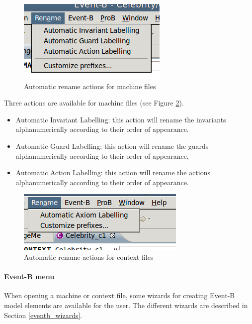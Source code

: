 \begin{figure}[!ht]
\begin{center}
	\includegraphics{img/reference/ref_01_menubar1.png}
	\caption{Automatic rename actions for machine files}
	\label{fig_ref_01_menubar1}
\end{center}
\end{figure}

Three actions are available for machine files (see Figure \ref{fig_ref_01_menubar2}).

    \begin{itemize}
    	\item Automatic Invariant Labelling: this action will rename the invariants alphanumerically according to their order of appearance.
	\item Automatic Guard Labelling: this action will rename the guards alphanumerically according to their order of appearance,
	\item Automatic Action Labelling: this action will rename the actions alphanumerically according to their order of appearance. 
    \end{itemize}

\begin{figure}[!ht]
\begin{center}
	\includegraphics{img/reference/ref_01_menubar2.png}
	\caption{Automatic rename actions for context files}
	\label{fig_ref_01_menubar2}
\end{center}
\end{figure}

\paragraph{Event-B menu}

When opening a machine or context file, some wizards for creating Event-B model elements are available for the user. The different wizards are described in Section \ref{eventb_wizards}.

